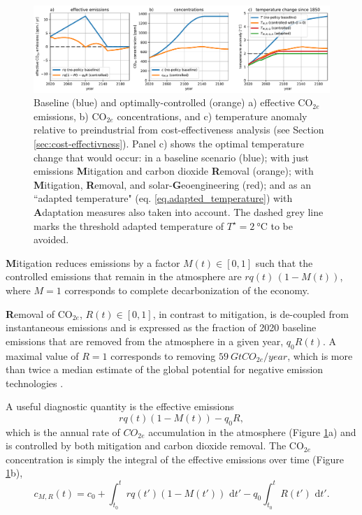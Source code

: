 \documentclass[9pt,twocolumn,twoside,lineno]{pnas-new}
\begin{document}
\begin{figure}%
\centering
\includegraphics[width=17.8cm]{figures/default-temp_carbon_and_temperatures.pdf}
\caption{Baseline (blue) and optimally-controlled (orange) a) effective CO$_{2e}$ emissions, b) CO$_{2e}$ concentrations, and c) temperature anomaly relative to preindustrial from cost-effectiveness analysis (see Section \ref{sec:cost-effectivness}). Panel c) shows the optimal temperature change that would occur: in a baseline scenario (blue); with just emissions \textbf{M}itigation and carbon dioxide \textbf{R}emoval (orange); with \textbf{M}itigation, \textbf{R}emoval, and solar-\textbf{G}eoengineering (red); and as an ``adapted temperature" (eq. \ref{eq.adapted_temperature}) with \textbf{A}daptation measures also taken into account. The dashed grey line marks the threshold adapted temperature of $T^{\star} = \SI{2}{\celsius}$ to be avoided.}
\label{fig:carbon_and_temperature}
\end{figure}

\textbf{M}itigation reduces emissions by a factor $M(t) \in [0,1]$ such that the controlled emissions that remain in the atmosphere are $rq(t)\,(1-M(t))$, where $M = 1$ corresponds to complete decarbonization of the economy.

\textbf{R}emoval of CO$_{2e}$, $R(t) \in [0,1]$, in contrast to mitigation, is de-coupled from instantaneous emissions and is expressed as the fraction of 2020 baseline emissions that are removed from the atmosphere in a given year, $q_{0}R(t)$. A maximal value of $R=1$ corresponds to removing $\SI{59}{GtCO_{2e} / year}$, which is more than twice a median estimate of the global potential for negative emission technologies \cite{fuss_negative_2018}.

A useful diagnostic quantity is the effective emissions
\begin{equation}
    rq(t)(1-M(t)) - q_{0}R,
    \label{eq:effective-emissions}
\end{equation} which is the annual rate of $CO_{2e}$ accumulation in the atmosphere (Figure \ref{fig:carbon_and_temperature}a) and is controlled by both mitigation and carbon dioxide removal.
The CO$_{2e}$ concentration is simply the integral of the effective emissions over time (Figure \ref{fig:carbon_and_temperature}b),
\begin{equation}
    c_{M,R}(t) = c_{0} + \int_{t_{0}}^{t} rq(t')(1-M(t')) \text{ d}t' - q_{0} \int_{t_{0}}^{t} R(t')\text{ d}t'.
\end{equation}
\end{document}
